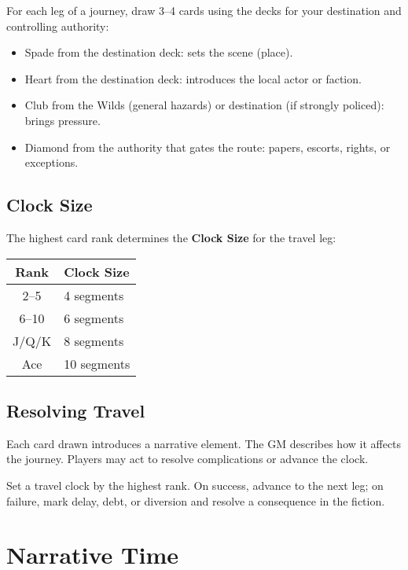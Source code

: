 For each leg of a journey, draw 3–4 cards using the decks for your destination and controlling authority:

\begin{itemize}
  \item Spade from the destination deck: sets the scene (place).
  \item Heart from the destination deck: introduces the local actor or faction.
  \item Club from the Wilds (general hazards) or destination (if strongly policed): brings pressure.
  \item Diamond from the authority that gates the route: papers, escorts, rights, or exceptions.
\end{itemize}

\subsection*{Clock Size}

The highest card rank determines the \textbf{Clock Size} for the travel leg:

\begin{center}
\begin{tabular}{cl}
\toprule
\textbf{Rank} & \textbf{Clock Size} \\
\midrule
2–5 & 4 segments \\
6–10 & 6 segments \\
J/Q/K & 8 segments \\
Ace & 10 segments \\
\bottomrule
\end{tabular}
\end{center}

\subsection*{Resolving Travel}

Each card drawn introduces a narrative element. The GM describes how it affects the journey. Players may act to resolve complications or advance the clock.

Set a travel clock by the highest rank. On success, advance to the next leg; on failure, mark delay, debt, or diversion and resolve a consequence in the fiction.

\section{Narrative Time}

